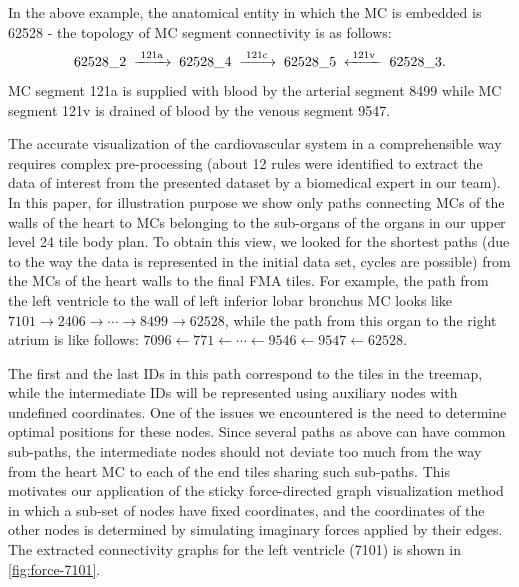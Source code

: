 In the above example, the anatomical entity in which the MC is embedded is 62528 - the topology of MC segment connectivity is as follows:
\[
	62528\_2  \;\xrightarrow{\;\text{121a}\;}\;
	62528\_4  \;\xrightarrow{\;\text{121c}\;}\;
	62528\_5  \;\xleftarrow {\;\text{121v}\;}\;
	62528\_3  \text.
\]
MC segment 121a is supplied with blood by the arterial segment 8499 while MC segment 121v is drained of blood by the venous segment 9547.

The accurate visualization of the cardiovascular system in a comprehensible way requires complex pre-processing (about 12 rules were identified to extract the data of interest from the presented dataset by a biomedical expert in our team).
In this paper, for illustration purpose we show only paths connecting MCs of the walls of the heart to MCs belonging to the sub-organs of the organs in our upper level 24 tile body plan.
To obtain this view, we looked for the shortest paths (due to the way the data is represented in the initial data set, cycles are possible) from the MCs of the heart walls to the final FMA tiles. For example, the path from the left ventricle to the wall of left inferior lobar bronchus MC looks like 
{$7101 \rightarrow 2406 \rightarrow \cdots \rightarrow 8499 \rightarrow 62528$,}
while the path from this organ to the right atrium is like follows: 
{$7096 \leftarrow 771 \leftarrow \cdots \leftarrow 9546 \leftarrow 9547 \leftarrow 62528$.}

The first and the last IDs in this path correspond to the tiles in the treemap, while the intermediate IDs will be represented using auxiliary nodes with undefined coordinates. One of the issues we encountered is the need to determine optimal positions for these nodes. Since several paths as above can have common sub-paths, the intermediate nodes should not deviate too much from the way from the heart MC to each of the end tiles sharing such sub-paths. This motivates our application of the sticky force-directed graph visualization method~\cite{FR91,Bos14} in which a sub-set of nodes have fixed coordinates, and the coordinates of the other nodes is determined by simulating imaginary forces applied by their edges.
The extracted connectivity graphs for the left ventricle (7101) is shown in \cref{fig:force-7101}.


